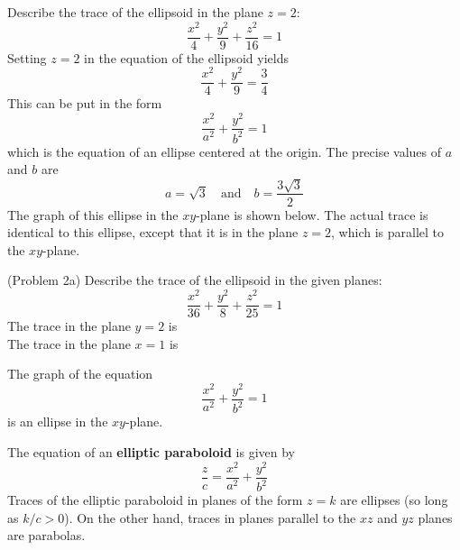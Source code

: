 \documentclass[handout]{ximera}
\begin{document}
\begin{example}[Example 2]
Describe the trace of the ellipsoid in the plane $z = 2$:
\[
\frac{x^2}{4} + \frac{y^2}{9}+ \frac{z^2}{16} = 1
\]
Setting $z = 2$ in the equation of the ellipsoid yields
\[
\frac{x^2}{4} + \frac{y^2}{9} = \frac34
\]
This can be put in the form
\[
\frac{x^2}{a^2} + \frac{y^2}{b^2} = 1
\]
which is the equation of an ellipse centered at the origin. The precise values of $a$ and $b$ are
\[
a = \sqrt 3 \quad \text{and} \quad b = \frac{3\sqrt 3}{2}
\]
The graph of this ellipse in the $xy$-plane is shown below.
The actual trace is identical to this ellipse, except that it is in the plane $z = 2$, which is parallel to the $xy$-plane.

\begin{image}
\end{image}

\end{example}

\begin{problem}(Problem 2a)
Describe the trace of the ellipsoid in the given planes:
\[
\frac{x^2}{36} + \frac{y^2}{8}+ \frac{z^2}{25} = 1
\]
The trace in the plane $y = 2$ is \\
The trace in the plane $x = 1$ is 
\begin{hint}
The graph of the equation
\[
\frac{x^2}{a^2} + \frac{y^2}{b^2} = 1
\]
is an ellipse in the $xy$-plane.
\end{hint}
\end{problem}

The equation of an \textbf{elliptic paraboloid} is given by 
\[
\frac{z}{c} = \frac{x^2}{a^2} + \frac{y^2}{b^2} 
\]
Traces of the elliptic paraboloid in planes of the form $z = k$ are ellipses (so long as $k/c > 0$).
On the other hand, traces in planes parallel to the $xz$ and $yz$ planes are parabolas.
\end{document}

